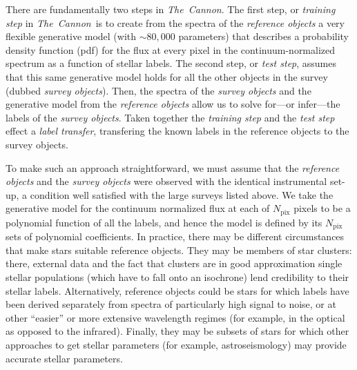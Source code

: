 \documentclass[12pt, preprint]{aastex}
\newcommand{\tc}{\textsl{The~Cannon}}
\newcommand{\pix}{\mathrm{pix}}
\begin{document}
There are fundamentally two steps in \tc. 
The first step, or \textit{training step} in \tc\ is to create from the spectra of the \textit{reference objects} a very flexible generative model (with $\sim 80,000$ parameters) that describes a probability density function (pdf) for
 the flux at every pixel in the continuum-normalized spectrum as a function of stellar labels.
The second step, or \textit{test step}, assumes that this same generative model holds for all the other objects in the survey (dubbed \textit{survey objects}). 
Then, the spectra of the \textit{survey objects} and the generative model from the \textit{reference objects}
allow us to solve for---or infer---the labels of the \textit{survey objects}. 
Taken together the \textit{training step} and the \textit{test step} effect a \textit{label transfer},
transfering the known labels in the reference objects to the survey objects.

To make such an approach straightforward, we must assume that the \textit{reference objects} and the \textit{survey objects} were observed with the identical instrumental set-up, a condition well satisfied with the large surveys listed above. 
We take the generative model for the continuum normalized flux at each of $N_\pix$ pixels to be a polynomial function of all the labels, and hence the model is defined by its $N_\pix$ sets of polynomial coefficients. In practice, there may be different circumstances that make stars suitable reference objects. 
They may be members of star clusters: there, external data and the fact that clusters are in good approximation single stellar populations (which have to fall onto an isochrone) lend credibility to their stellar labels. 
Alternatively, reference objects could be stars for which labels have been derived separately from spectra of particularly high signal to noise, or at other ``easier'' or more extensive wavelength regimes (for example, in the optical as opposed to the infrared). 
Finally, they may be subsets of stars for which other approaches to get stellar parameters (for example, astroseismology) may provide accurate stellar parameters.
\end{document}
